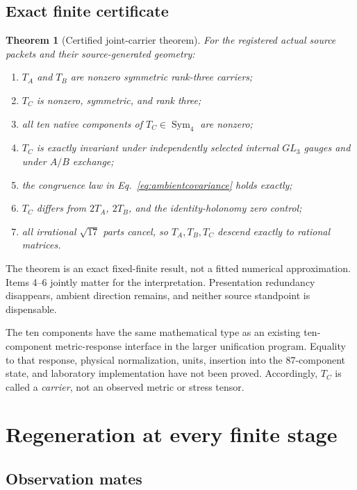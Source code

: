 \documentclass[11pt]{article}
\newtheorem{theorem}{Theorem}[section]
\theoremstyle{definition}
\theoremstyle{remark}
\newcommand{\Sym}{\operatorname{Sym}}
\begin{document}
\subsection{Exact finite certificate}

\begin{theorem}[Certified joint-carrier theorem]\label{thm:x60}
For the registered actual source packets and their source-generated geometry:
\begin{enumerate}
\item $T_A$ and $T_B$ are nonzero symmetric rank-three carriers;
\item $T_C$ is nonzero, symmetric, and rank three;
\item all ten native components of $T_C\in\Sym_4$ are nonzero;
\item $T_C$ is exactly invariant under independently selected internal $GL_3$ gauges and under $A/B$ exchange;
\item the congruence law in Eq.~\eqref{eq:ambientcovariance} holds exactly;
\item $T_C$ differs from $2T_A$, $2T_B$, and the identity-holonomy zero control;
\item all irrational $\sqrt{17}$ parts cancel, so $T_A,T_B,T_C$ descend exactly to rational matrices.
\end{enumerate}
\end{theorem}

The theorem is an exact fixed-finite result, not a fitted numerical approximation. Items 4--6 jointly matter for the interpretation. Presentation redundancy disappears, ambient direction remains, and neither source standpoint is dispensable.

The ten components have the same mathematical type as an existing ten-component metric-response interface in the larger unification program. Equality to that response, physical normalization, units, insertion into the 87-component state, and laboratory implementation have not been proved. Accordingly, $T_C$ is called a \emph{carrier}, not an observed metric or stress tensor.

\section{Regeneration at every finite stage}

\subsection{Observation mates}
\end{document}

